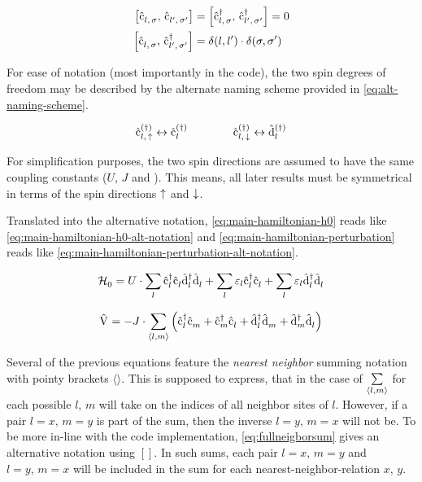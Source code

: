 \begin{equation}
    \label{eq:commutation-relations}
    \begin{split}
        \left[\withspinop[]{l}{\sigma}{},\,\withspinop[]{l'}{\sigma'}{}\right] &= 
        \left[\withspinop[]{l}{\sigma}{\dagger},\,\withspinop[]{l'}{\sigma'}{\dagger}\right] = 0\\
        \left[\withspinop[]{l}{\sigma}{},\,\withspinop[]{l'}{\sigma'}{\dagger}\right] &= \delta(l,l')\cdot\delta(\sigma,\sigma') 
    \end{split}
\end{equation}

For ease of notation (most importantly in the code), the two spin degrees of freedom may be described by the alternate naming scheme provided in \autoref{eq:alt-naming-scheme}.

\begin{equation}
    \label{eq:alt-naming-scheme}
    \withspinop{l}{\up}{(\dagger)} \leftrightarrow \cop{l}{(\dagger)}
    \qquad\qquad
    \withspinop{l}{\down}{(\dagger)} \leftrightarrow \dop{l}{(\dagger)}
\end{equation}

For simplification purposes, the two spin directions are assumed to have the same coupling constants ($U$, $J$ and \epsl).
This means, all later results must be symmetrical in terms of the spin directions $\up$ and $\down$.


Translated into the alternative notation, \autoref{eq:main-hamiltonian-h0} reads like \autoref{eq:main-hamiltonian-h0-alt-notation} and \autoref{eq:main-hamiltonian-perturbation} reads like \autoref{eq:main-hamiltonian-perturbation-alt-notation}.

\begin{equation}
    \label{eq:main-hamiltonian-h0-alt-notation}
    \HzeroHamiltonian = U \cdot \lsum \cop[]{l}{\dagger}\cop[]{l}{} \dop[]{l}{\dagger}\dop[]{l}{} + \lsum\epsl \cop[]{l}{\dagger}\cop[]{l}{} + \lsum\epsl \dop[]{l}{\dagger}\dop[]{l}{}
\end{equation}

\begin{equation}
    \label{eq:main-hamiltonian-perturbation-alt-notation}
    \Vhamiltonian =  - J \cdot \neighborsum{l}{m} \left(\cop[]{l}{\dagger}\cop[]{m}{} +\cop[]{m}{\dagger}\cop[]{l}{} + \dop[]{l}{\dagger}\dop[]{m}{} +\dop[]{m}{\dagger}\dop[]{l}{} \right)
\end{equation}

Several of the previous equations feature the \emph{nearest neighbor} summing notation with pointy brackets $\langle\rangle$.
This is supposed to express, that in the case of $\neighborsum[]{l}{m}$ for each possible $l$, $m$ will take on the indices of all neighbor sites of $l$.
However, if a pair $l=x,\,m=y$ is part of the sum, then the inverse $l=y,\,m=x$ will not be.
To be more in-line with the code implementation, \autoref{eq:fullneigborsum} gives an alternative notation using $[]$.
In such sums, each pair $l=x,\,m=y$ and $l=y,\,m=x$ will be included in the sum for each nearest-neighbor-relation $x,\,y$.


